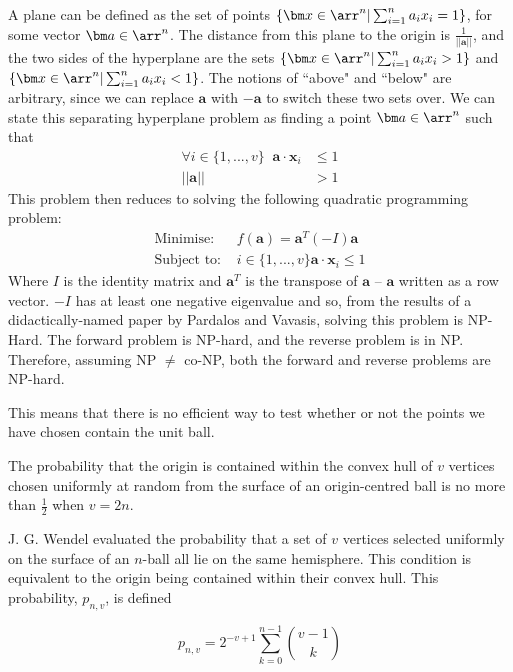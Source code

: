 A plane can be defined as the set of points $\{ {\bm x} \in \arr ^n | \sum^n_{i=1} a_i x_i = 1\}$, for some vector ${\bm a} \in \arr ^n$. The distance from this plane to the origin is $\frac{1}{||{\bm a}||}$, and the two sides of the hyperplane are the sets $\{ {\bm x} \in \arr ^n | \sum^n_{i=1} a_i x_i > 1 \}$ and $\{ {\bm x} \in \arr ^n | \sum^n_{i=1} a_i x_i < 1 \}$. The notions of ``above" and ``below" are arbitrary, since we can replace $\bm a$ with $-\bm{a}$ to switch these two sets over. We can state this separating hyperplane problem as finding a point ${\bm a} \in \arr^n$ such that
\begin{align*}
\forall i \in \{1, ..., v\} \; \; {\bm a} \cdot {\bm x}_i &\leqslant 1 \\
||{\bm a}|| &> 1
\end{align*}
This problem then reduces to solving the following quadratic programming problem:
\begin{align*}
\mbox{Minimise: }& f({\bm a}) = {\bm a}^T (-I) {\bm a} \\
\mbox{Subject to: }& i \in \{1, ..., v\} {\bm a} \cdot {\bm x}_i \leqslant 1 
\end{align*}
Where $I$ is the identity matrix and ${\bm a}^T$ is the transpose of ${\bm a}$ -- ${\bm a}$ written as a row vector. $-I$ has at least one negative eigenvalue and so, from the results of a didactically-named paper by Pardalos and Vavasis\cite{Pardalos91}, solving this problem is NP-Hard. The forward problem is NP-hard, and the reverse problem is in NP. Therefore, assuming NP $\neq$ co-NP, both the forward and reverse problems are NP-hard.

This means that there is no efficient way to test whether or not the points we have chosen contain the unit ball.

\begin{proposition}
The probability that the origin is contained within the convex hull of $v$ vertices chosen uniformly at random from the surface of an origin-centred ball is no more than $\frac{1}{2}$ when $v = 2n$.
\end{proposition}

J. G. Wendel\cite{Wendel62} evaluated the probability that a set of $v$ vertices selected uniformly on the surface of an $n$-ball all lie on the same hemisphere. This condition is equivalent to the origin being contained within their convex hull. This probability, $p_{n,v}$, is defined

$$
p_{n,v} = 2^{-v+1} \sum_{k=0}^{n-1} {{v-1} \choose k}
$$


